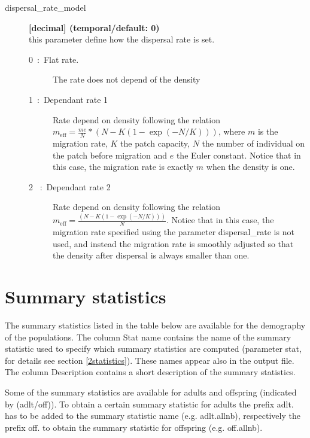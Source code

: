 \documentclass[letterpaper,12pt,oneside]{book}
\begin{document}
 \begin{description}
\item[dispersal\_rate\_model] \textbf{[decimal] (temporal/default: 0)}\\
this parameter define how the dispersal rate is set.
\begin{description}
                  \item[0~:~Flat rate.] The rate does not depend of the density
                  \item [1~:~Dependant rate 1] Rate depend on density following the relation $ m_{\text{eff}} = \frac{me}{N}*(N-K(1-\exp(-N/K)))$, where $m$ is the migration rate, $K$ the patch capacity, $N$ the number of individual on the patch before migration and $e$ the Euler constant. Notice that in this case, the migration rate is exactly $m$ when the density is one.
                   \item [2 ~:~Dependant rate 2] Rate depend on density following the relation $m_{\text{eff}} =\frac{(N-K(1-\exp(-N/K)))}{N}$. Notice that in this case, the migration rate specified using the parameter \textsf{dispersal\_rate} is not used, and instead the migration rate is smoothly adjusted so that the density after dispersal is always smaller than one. 
\end{description}
\end{description}




\section{Summary statistics}\label{ssPops}
The summary statistics listed in the table below are available for the demography of the populations. The column \textsf{Stat name} contains the name of the summary statistic used to specify which summary statistics are computed (parameter \textsf{stat}, for details see section \ref{2statistics}). These names appear also in the output file. The column \textsf{Description} contains a short description of the summary statistics. 

Some of the summary statistics are available for adults and offspring (indicated by \textsf{(adlt/off)}). To obtain a certain summary statistic for adults the prefix \textsf{adlt.} has to be added to the summary statistic name (e.g. \textsf{adlt.allnb}), respectively the prefix \textsf{off.} to obtain the summary statistic for offspring (e.g. \textsf{off.allnb}). 
\end{document}
